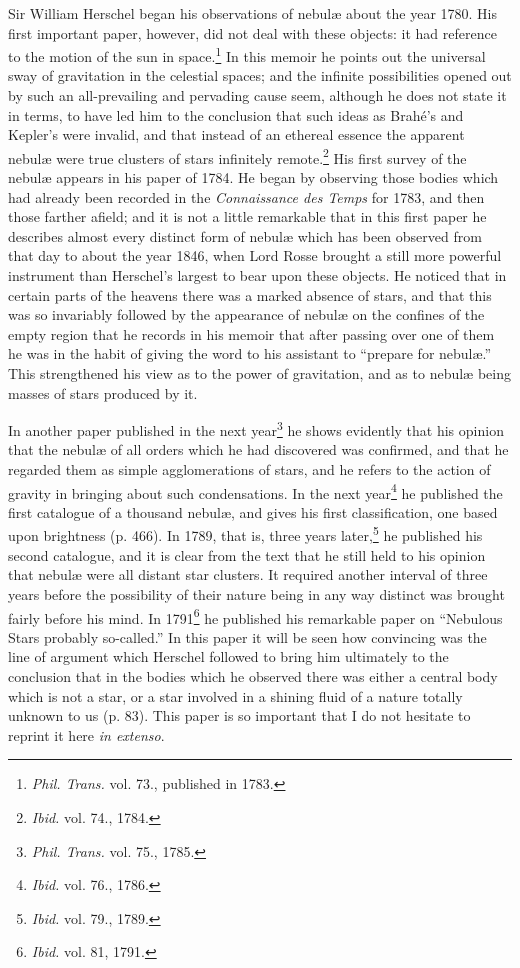 \documentclass[a4paper, 12pt, oneside, polutonikogreek, english]{article}
\begin{document}
Sir William Herschel began his observations of nebulæ about the year 1780. His first important paper, however, did not deal with these objects: it had reference to the motion of the sun in space.\footnote{\emph{Phil. Trans.} vol. 73., published in 1783.} In this memoir he points out the universal sway of gravitation in the celestial spaces; and the infinite possibilities opened out by such an all-prevailing and pervading cause seem, although he does not state it in terms, to have led him to the conclusion that such ideas as Brahé's and Kepler's were invalid, and that instead of an ethereal essence the apparent nebulæ were true clusters of stars infinitely remote.\footnote{\emph{Ibid.} vol. 74., 1784.} His first survey of the nebulæ appears in his paper of 1784. He began by observing those bodies which had already been recorded in the \emph{Connaissance des Temps} for 1783, and then those farther afield; and it is not a little remarkable that in this first paper he describes almost every distinct form of nebulæ which has been observed from that day to about the year 1846, when Lord Rosse brought a still more powerful instrument than Herschel's largest to bear upon these objects. He noticed that in certain parts of the heavens there was a marked absence of stars, and that this was so invariably followed by the appearance of nebulæ on the confines of the empty region that he records in his memoir that after passing over one of them he was in the habit of giving the word to his assistant to ``prepare for nebulæ.'' This strengthened his view as to the power of gravitation, and as to nebulæ being masses of stars produced by it.

In another paper published in the next year\footnote{\emph{Phil. Trans.} vol. 75., 1785.} he shows evidently that his opinion that the nebulæ of all orders which he had discovered was confirmed, and that he regarded them as simple agglomerations of stars, and he refers to the action of gravity in bringing about such condensations. In the next year\footnote{\emph{Ibid.} vol. 76., 1786.} he published the first catalogue of a thousand nebulæ, and gives his first classification, one based upon brightness (p. 466). In 1789, that is, three years later,\footnote{\emph{Ibid.} vol. 79., 1789.} he published his second catalogue, and it is clear from the text that he still held to his opinion that nebulæ were all distant star clusters. It required another interval of three years before the possibility of their nature being in any way distinct was brought fairly before his mind. In 1791\footnote{\emph{Ibid.} vol. 81, 1791.} he published his remarkable paper on ``Nebulous Stars probably so-called.'' In this paper it will be seen how convincing was the line of argument which Herschel followed to bring him ultimately to the conclusion that in the bodies which he observed there was either a central body which is not a star, or a star involved in a shining fluid of a nature totally unknown to us (p. 83). This paper is so important that I do not hesitate to reprint it here \emph{in extenso}.
\end{document}
